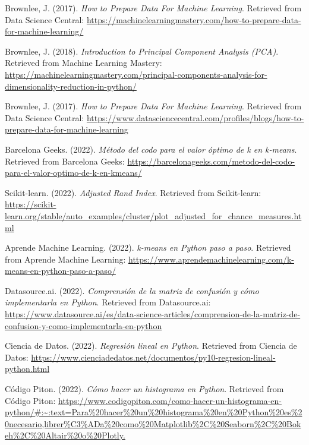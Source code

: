 \documentclass{wsdcr}
\begin{document}
\begin{thebibliography}{9}

    Brownlee, J. (2017).
    \textit{How to Prepare Data For Machine Learning}.
    Retrieved from Data Science Central: \url{https://machinelearningmastery.com/how-to-prepare-data-for-machine-learning/}

    Brownlee, J. (2018).
    \textit{Introduction to Principal Component Analysis (PCA)}.
    Retrieved from Machine Learning Mastery: \url{https://machinelearningmastery.com/principal-components-analysis-for-dimensionality-reduction-in-python/}

    Brownlee, J. (2017).
    \textit{How to Prepare Data For Machine Learning}.
    Retrieved from Data Science Central: \url{https://www.datasciencecentral.com/profiles/blogs/how-to-prepare-data-for-machine-learning}

    Barcelona Geeks. (2022).
    \textit{Método del codo para el valor óptimo de k en k-means}.
    Retrieved from Barcelona Geeks: \url{https://barcelonageeks.com/metodo-del-codo-para-el-valor-optimo-de-k-en-kmeans/}

    Scikit-learn. (2022).
    \textit{Adjusted Rand Index}.
    Retrieved from Scikit-learn: \url{https://scikit-learn.org/stable/auto_examples/cluster/plot_adjusted_for_chance_measures.html}

    Aprende Machine Learning. (2022).
    \textit{k-means en Python paso a paso}.
    Retrieved from Aprende Machine Learning: \url{https://www.aprendemachinelearning.com/k-means-en-python-paso-a-paso/}

    Datasource.ai. (2022).
    \textit{Comprensión de la matriz de confusión y cómo implementarla en Python}.
    Retrieved from Datasource.ai: \url{https://www.datasource.ai/es/data-science-articles/comprension-de-la-matriz-de-confusion-y-como-implementarla-en-python}

    Ciencia de Datos. (2022).
    \textit{Regresión lineal en Python}.
    Retrieved from Ciencia de Datos: \url{https://www.cienciadedatos.net/documentos/py10-regresion-lineal-python.html}

    Código Piton. (2022).
    \textit{Cómo hacer un histograma en Python}.
    Retrieved from Código Piton: \url{https://www.codigopiton.com/como-hacer-un-histograma-en-python/#:~:text=Para%20hacer%20un%20histograma%20en%20Python%20es%20necesario,librer%C3%ADa%20como%20Matplotlib%2C%20Seaborn%2C%20Bokeh%2C%20Altair%20o%20Plotly.}


\end{thebibliography}
\end{document}
